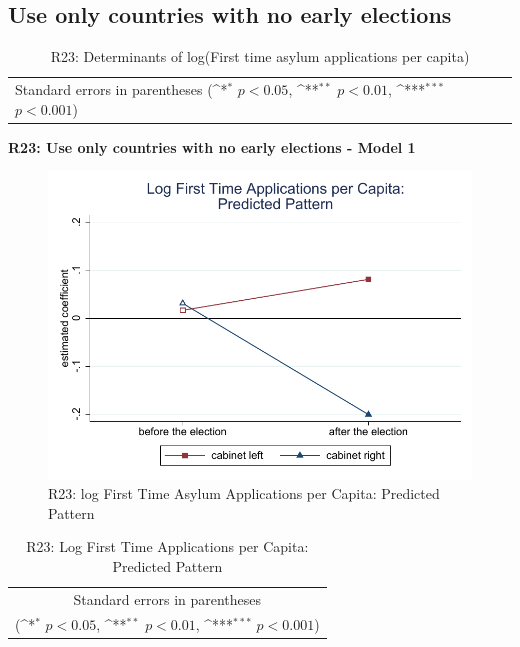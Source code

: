\documentclass[10pt,a4paper]{scrartcl}
\begin{document}


\clearpage
\FloatBarrier
\subsection{Use only countries with no early elections}
\begin{table}[!ht]\centering
	\renewcommand{\arraystretch}{1.25}
	\small
	\def\sym#1{\ifmmode^{#1}\else\(^{#1}\)\fi}
	\caption{R23: Determinants of log(First time asylum applications per capita)}
	\begin{tabular}{l*{3}{c}}
		\hline\hline
		
		\hline\hline
		\multicolumn{4}{l}{\footnotesize Standard errors in parentheses (\sym{*} \(p<0.05\), \sym{**} \(p<0.01\), \sym{***} \(p<0.001\))}\\
	\end{tabular}
\end{table}

\clearpage
\textbf{R23: Use only countries with no early elections - Model 1}
\begin{figure}[!ht]
	\centering
	\includegraphics[width=1\textwidth]{figures_edited/app_graph1_R23.pdf}
	\caption{R23: log First Time Asylum Applications per Capita: Predicted Pattern}
\end{figure}

\begin{table}[!ht]\centering
	\renewcommand{\arraystretch}{1.25}
	\def\sym#1{\ifmmode^{#1}\else\(^{#1}\)\fi}
	\caption{R23: Log First Time Applications per Capita: Predicted Pattern}
	\begin{tabular}{l*{2}{c}}
		\hline\hline
		
		\hline\hline
		\multicolumn{3}{c}{\footnotesize Standard errors in parentheses} \\
		\multicolumn{3}{c}{\footnotesize (\sym{*} \(p<0.05\), \sym{**} \(p<0.01\), \sym{***} \(p<0.001\))}\\
	\end{tabular}
\end{table}
\end{document}
